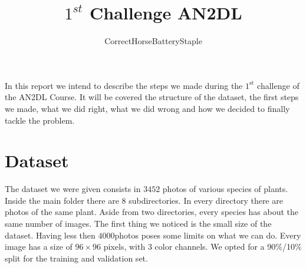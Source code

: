 \documentclass[a4paper,12pt]{article}
\numberwithin{equation}{section}
\begin{document}
\title{\vspace{-3cm}\(1^{st}\) Challenge AN2DL}
\author{CorrectHorseBatteryStaple}
\date{}
\maketitle
\fontsize{11pr}
In this report we intend to describe the steps we made during the \(1^{\text{st}}\) challenge of the AN2DL Course. It will be covered the structure of the dataset, the first steps we made, what we did right, what we did wrong and how we decided to finally tackle the problem.
\section*{Dataset}
The dataset we were given consists in \(3452\) photos of various species of plants. Inside the main folder there are \(8\) subdirectories. In every directory there are photos of the same plant. Aside from two directories, every species has about the same number of images. The first thing we noticed is the small size of the dataset. Having less then \(4000\)photos poses some limits on what we can do. Every image has a size of \(96 \times 96\) pixels, with \(3\) color channels. We opted for a 90\%/10\% split for the training and validation set.
\end{document}
